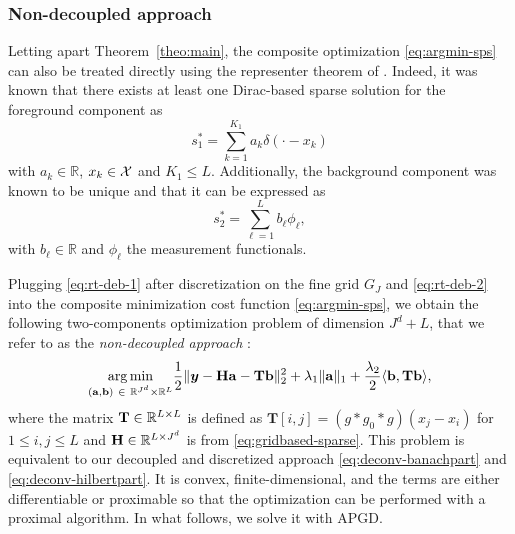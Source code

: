 \documentclass[12pt]{article}
\begin{document}
        \subsubsection{Non-decoupled approach}
        Letting apart Theorem~\ref{theo:main}, the composite optimization \eqref{eq:argmin-sps} can also be treated directly using the representer theorem of \cite{debarre2021continuous}. Indeed, it was known that there exists at least one Dirac-based sparse solution for the foreground component as
        \begin{equation}
            s_1^* = \sum_{k=1}^{K_1} a_{k} \delta(\cdot - x_k)
            \label{eq:rt-deb-1}
        \end{equation}
        with $a_{k} \in \mathbb{R}$, $x_k \in \mathcal{X}$ and $K_1 \leq L$.
        Additionally, the background component was known to be unique and that it can be expressed as
        \begin{equation}
            s_2^* = \sum_{\ell=1}^{L} b_{\ell} \phi_\ell,
            \label{eq:rt-deb-2}
        \end{equation}
        with $b_\ell \in \mathbb{R}$ and $\phi_\ell$ the measurement functionals.

        Plugging \eqref{eq:rt-deb-1} after discretization on the fine grid $G_J$ and \eqref{eq:rt-deb-2} into the composite minimization cost function \eqref{eq:argmin-sps}, we obtain the following two-components optimization problem of dimension $J^d + L$, that we refer to as the \emph{non-decoupled approach} :
        \begin{equation}
        \label{eq:ndcp-argmin}
            \underset{(\mathbf{a}, \mathbf{b})\ \in\ \mathbb{R}^{J^d} \times \mathbb{R}^L}{\arg\min} \frac{1}{2} \| \bm{y} - \mathbf{Ha} - \mathbf{Tb} \|_2^2  + \lambda_{1} \| \mathbf{a} \|_1 + \frac{\lambda_{2}}{2} \langle \mathbf{b}, \mathbf{Tb} \rangle,
        \end{equation}
        where the matrix $\mathbf{T} \in \mathbb{R}^{L \times L}$ is defined as
        $\mathbf{T}[i, j] = (g * g_0 * g)(x_j - x_i)$ for $1 \leq i, j \leq L$
        and $\mathbf{H} \in \mathbb{R}^{L\times J^d}$ is from \eqref{eq:gridbased-sparse}.
        This problem is equivalent to our decoupled and discretized approach \eqref{eq:deconv-banachpart} and \eqref{eq:deconv-hilbertpart}. It is convex, finite-dimensional, and the terms are either differentiable or proximable so that the optimization can be performed with a proximal algorithm. In what follows, we solve it with APGD. %
    
\end{document}
